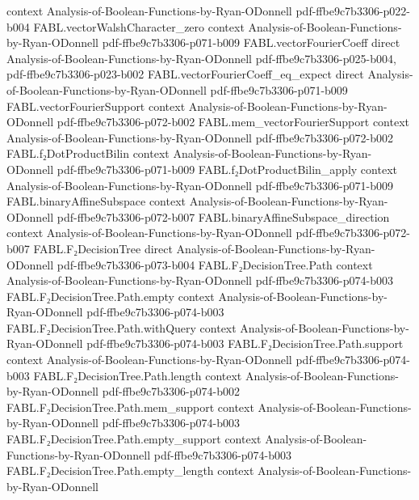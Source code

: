 \begin{theorem}
  {context}
  {Analysis-of-Boolean-Functions-by-Ryan-ODonnell}
  {pdf-ffbe9c7b3306-p022-b004}
\proofstep
  {FABL.vectorWalshCharacter_zero}
  {context}
  {Analysis-of-Boolean-Functions-by-Ryan-ODonnell}
  {pdf-ffbe9c7b3306-p071-b009}
\proofstep
  {FABL.vectorFourierCoeff}
  {direct}
  {Analysis-of-Boolean-Functions-by-Ryan-ODonnell}
  {pdf-ffbe9c7b3306-p025-b004,
    pdf-ffbe9c7b3306-p023-b002}
\proofstep
  {FABL.vectorFourierCoeff_eq_expect}
  {direct}
  {Analysis-of-Boolean-Functions-by-Ryan-ODonnell}
  {pdf-ffbe9c7b3306-p071-b009}
\proofstep
  {FABL.vectorFourierSupport}
  {context}
  {Analysis-of-Boolean-Functions-by-Ryan-ODonnell}
  {pdf-ffbe9c7b3306-p072-b002}
\proofstep
  {FABL.mem_vectorFourierSupport}
  {context}
  {Analysis-of-Boolean-Functions-by-Ryan-ODonnell}
  {pdf-ffbe9c7b3306-p072-b002}
\proofstep
  {FABL.f₂DotProductBilin}
  {context}
  {Analysis-of-Boolean-Functions-by-Ryan-ODonnell}
  {pdf-ffbe9c7b3306-p071-b009}
\proofstep
  {FABL.f₂DotProductBilin_apply}
  {context}
  {Analysis-of-Boolean-Functions-by-Ryan-ODonnell}
  {pdf-ffbe9c7b3306-p071-b009}
\proofstep
  {FABL.binaryAffineSubspace}
  {context}
  {Analysis-of-Boolean-Functions-by-Ryan-ODonnell}
  {pdf-ffbe9c7b3306-p072-b007}
\proofstep
  {FABL.binaryAffineSubspace_direction}
  {context}
  {Analysis-of-Boolean-Functions-by-Ryan-ODonnell}
  {pdf-ffbe9c7b3306-p072-b007}
\proofstep
  {FABL.F₂DecisionTree}
  {direct}
  {Analysis-of-Boolean-Functions-by-Ryan-ODonnell}
  {pdf-ffbe9c7b3306-p073-b004}
\proofstep
  {FABL.F₂DecisionTree.Path}
  {context}
  {Analysis-of-Boolean-Functions-by-Ryan-ODonnell}
  {pdf-ffbe9c7b3306-p074-b003}
\proofstep
  {FABL.F₂DecisionTree.Path.empty}
  {context}
  {Analysis-of-Boolean-Functions-by-Ryan-ODonnell}
  {pdf-ffbe9c7b3306-p074-b003}
\proofstep
  {FABL.F₂DecisionTree.Path.withQuery}
  {context}
  {Analysis-of-Boolean-Functions-by-Ryan-ODonnell}
  {pdf-ffbe9c7b3306-p074-b003}
\proofstep
  {FABL.F₂DecisionTree.Path.support}
  {context}
  {Analysis-of-Boolean-Functions-by-Ryan-ODonnell}
  {pdf-ffbe9c7b3306-p074-b003}
\proofstep
  {FABL.F₂DecisionTree.Path.length}
  {context}
  {Analysis-of-Boolean-Functions-by-Ryan-ODonnell}
  {pdf-ffbe9c7b3306-p074-b002}
\proofstep
  {FABL.F₂DecisionTree.Path.mem_support}
  {context}
  {Analysis-of-Boolean-Functions-by-Ryan-ODonnell}
  {pdf-ffbe9c7b3306-p074-b003}
\proofstep
  {FABL.F₂DecisionTree.Path.empty_support}
  {context}
  {Analysis-of-Boolean-Functions-by-Ryan-ODonnell}
  {pdf-ffbe9c7b3306-p074-b003}
\proofstep
  {FABL.F₂DecisionTree.Path.empty_length}
  {context}
  {Analysis-of-Boolean-Functions-by-Ryan-ODonnell}

\end{theorem}
